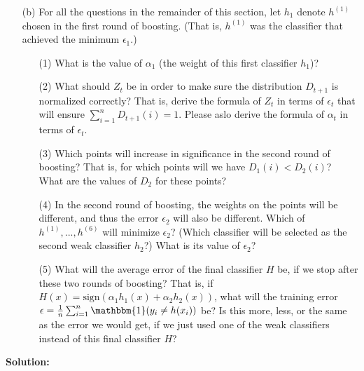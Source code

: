 \documentclass[10pt]{article}
\begin{document}
\begin{enumerate}[1.]
\begin{itemize}
	        \item[(b)] For all the questions in the remainder of this section, let $h_{1}$ denote $h^{(1)}$ chosen in the first round of boosting. (That is, $h^{(1)}$ was the classifier that achieved the minimum $\epsilon_{1}$.)
		        \begin{enumerate}
			        \item[(1)] What is the value of $\alpha_{1}$ (the weight of this first classifier $h_{1}$)? ~\\

			        \item[(2)] What should $Z_{t}$ be in order to make sure the distribution $D_{t+1}$ is normalized correctly? That is, derive the formula of $Z_{t}$ in terms of $\epsilon_{t}$ that will ensure $\sum_{i=1}^{n} D_{t+1}(i) = 1$. Please aslo derive the formula of $\alpha_{t}$ in terms of $\epsilon_{t}$. ~\\

			        \item[(3)] Which points will increase in significance in the second round of boosting? That is, for which points will we have $D_{1}(i) < D_{2}(i)$? What are the values of $D_{2}$ for these points?~\\

			        \item[(4)] In the second round of boosting, the weights on the points will be different, and thus the error $\epsilon_2$ will also be different. Which of $h^{(1)}, . . . , h^{(6)}$ will minimize $\epsilon_2$? (Which classifier will be selected as the second weak classifier $h_2$?) What is its value of $\epsilon_2$?~\\

			        \item[(5)] What will the average error of the final classifier $H$ be, if we stop after these two rounds of boosting? That is, if $H(x) = \text{sign}(\alpha_{1}h_{1}(x) + \alpha_{2}h_{2}(x))$, what will the  training error $\epsilon = \frac{1}{n} \sum_{i=1}^{n} \mathbbm{1} (y_{i} \neq h(x_{i}))$ be? Is this more, less, or the same as the error we would get, if we just used one of the weak classifiers instead of this final classifier $H$?~\\

		        \end{enumerate}
        \end{itemize}
		\textbf{Solution:}


\end{enumerate}
\end{document}
